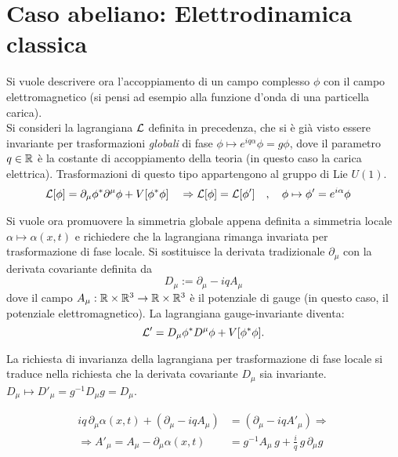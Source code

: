 \section{Caso abeliano: Elettrodinamica classica}
Si vuole descrivere ora l'accoppiamento di un campo complesso $\phi$ con il campo
elettromagnetico (si pensi ad esempio alla funzione d'onda di una particella carica).\\
Si consideri la lagrangiana $\mathcal{L}$ definita in precedenza, che si è già visto
essere invariante per trasformazioni \emph{globali} di fase $\phi \mapsto e^{iq\alpha}\phi = g\phi$,
dove il parametro $q \in \mathbb{R}$ è la costante di accoppiamento della teoria
(in questo caso la carica elettrica). Trasformazioni di questo tipo appartengono
al gruppo di Lie $U(1)$.
%
\begin{equation*}
  \begin{aligned}
     \mathcal{L} [\phi] & = \partial _\mu \phi^*  \partial ^\mu \phi + V[\phi ^* \phi] &
     & \Rightarrow \mathcal{L}[\phi] = \mathcal{L}[\phi'] & ,\quad
     \phi &\mapsto \phi' = e^{i\alpha}\phi
  \end{aligned}
\end{equation*}

Si vuole ora promuovere la simmetria globale appena definita a simmetria locale
$\alpha \mapsto \alpha(x,t)$ e richiedere che la lagrangiana rimanga invariata
per trasformazione di fase locale.
Si sostituisce la derivata tradizionale $\partial _\mu$ con la derivata covariante
definita da
%
$$
   D _\mu := \partial _\mu -iq A _\mu
$$
dove il campo $A _\mu : \mathbb{R} \times \mathbb{R}^3 \to \mathbb{R} \times \mathbb{R}^3$ è il potenziale
di gauge (in questo caso, il potenziale elettromagnetico). La lagrangiana
gauge-invariante diventa:
$$
   \mathcal{L} ' =  D _\mu \phi^*  D ^\mu \phi + V[\phi ^* \phi].
$$

La richiesta di invarianza della lagrangiana per trasformazione
di fase locale si traduce nella richiesta che la derivata covariante $D _\mu$
sia invariante. $D _\mu \mapsto D' _\mu = g^{-1} D _\mu g = D _\mu $.

\begin{equation}
   \begin{aligned}
      iq \, \partial _\mu \alpha(x,t) + (\partial _\mu - iq A _\mu)
         & = (\partial _\mu -iq A' _\mu) \Rightarrow \\
      \Rightarrow A' _\mu = A _\mu - \partial _\mu  \alpha(x,t)
         & = g ^{-1} A _\mu \, g + \frac{i}{q} \, g \, \partial _\mu g
   \end{aligned}
\end{equation}

